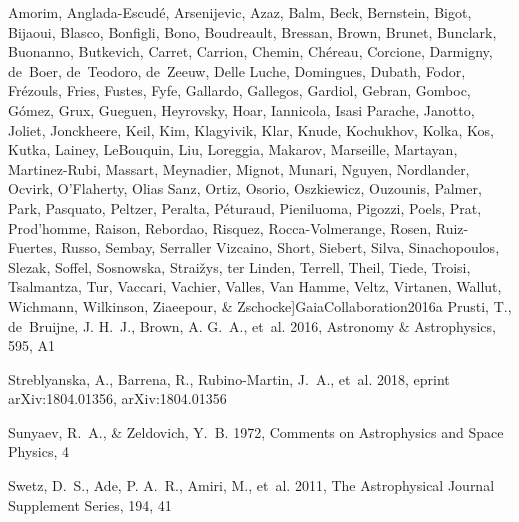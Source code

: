 \documentclass[apj, revtex4-1]{emulateapj}
\begin{document}
\begin{thebibliography}{}
{  Amorim, Anglada-Escud{\'{e}}, Arsenijevic, Azaz, Balm, Beck, Bernstein,
  Bigot, Bijaoui, Blasco, Bonfigli, Bono, Boudreault, Bressan, Brown, Brunet,
  Bunclark, Buonanno, Butkevich, Carret, Carrion, Chemin, Ch{\'{e}}reau,
  Corcione, Darmigny, de~Boer, de~Teodoro, de~Zeeuw, {Delle Luche}, Domingues,
  Dubath, Fodor, Fr{\'{e}}zouls, Fries, Fustes, Fyfe, Gallardo, Gallegos,
  Gardiol, Gebran, Gomboc, G{\'{o}}mez, Grux, Gueguen, Heyrovsky, Hoar,
  Iannicola, {Isasi Parache}, Janotto, Joliet, Jonckheere, Keil, Kim,
  Klagyivik, Klar, Knude, Kochukhov, Kolka, Kos, Kutka, Lainey, LeBouquin, Liu,
  Loreggia, Makarov, Marseille, Martayan, Martinez-Rubi, Massart, Meynadier,
  Mignot, Munari, Nguyen, Nordlander, Ocvirk, O'Flaherty, {Olias Sanz}, Ortiz,
  Osorio, Oszkiewicz, Ouzounis, Palmer, Park, Pasquato, Peltzer, Peralta,
  P{\'{e}}turaud, Pieniluoma, Pigozzi, Poels, Prat, Prod'homme, Raison,
  Rebordao, Risquez, Rocca-Volmerange, Rosen, Ruiz-Fuertes, Russo, Sembay,
  {Serraller Vizcaino}, Short, Siebert, Silva, Sinachopoulos, Slezak, Soffel,
  Sosnowska, Strai{\v{z}}ys, ter Linden, Terrell, Theil, Tiede, Troisi,
  Tsalmantza, Tur, Vaccari, Vachier, Valles, {Van Hamme}, Veltz, Virtanen,
  Wallut, Wichmann, Wilkinson, Ziaeepour, \& Zschocke}]{GaiaCollaboration2016a}
Prusti, T., de~Bruijne, J. H.~J., Brown, A. G.~A., {et~al.} 2016, Astronomy
  {\&} Astrophysics, 595, A1

Streblyanska, A., Barrena, R., Rubino-Martin, J.~A., {et~al.} 2018, eprint
  arXiv:1804.01356, arXiv:1804.01356

Sunyaev, R.~A., \& Zeldovich, Y.~B. 1972, Comments on Astrophysics and Space
  Physics, 4

Swetz, D.~S., Ade, P. A.~R., Amiri, M., {et~al.} 2011, The Astrophysical
  Journal Supplement Series, 194, 41


\end{thebibliography}
\end{document}
